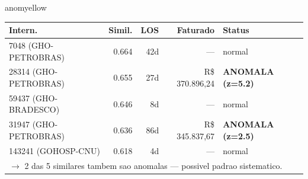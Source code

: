 \documentclass[a4paper,10pt]{article}
\begin{document}
\begin{anomalycard}[Internacao 165641 | GHO-PETROBRAS | MODERADO (z=2.56)]{anomyellow}
\begin{tabular}{l r r r l}\toprule\textbf{Intern.} & \textbf{Simil.} & \textbf{LOS} & \textbf{Faturado} & \textbf{Status} \\\midrule
7048 (GHO-PETROBRAS) & 0.664 & 42d & --- & \textcolor{jcubeblue}{normal} \\
28314 (GHO-PETROBRAS) & 0.655 & 27d & R\$ 370.896,24 & \textcolor{anomred}{\textbf{ANOMALA (z=5.2)}} \\
59437 (GHO-BRADESCO) & 0.646 & 8d & --- & \textcolor{jcubeblue}{normal} \\
31947 (GHO-PETROBRAS) & 0.636 & 86d & R\$ 345.837,67 & \textcolor{anomred}{\textbf{ANOMALA (z=2.5)}} \\
143241 (GOHOSP-CNU) & 0.618 & 4d & --- & \textcolor{jcubeblue}{normal} \\
\multicolumn{5}{l}{\textcolor{anomred}{\small $\rightarrow$ 2 das 5 similares tambem sao anomalas --- possivel padrao sistematico.}} \\
\bottomrule\end{tabular}


\end{anomalycard}

\newpage
\end{document}
